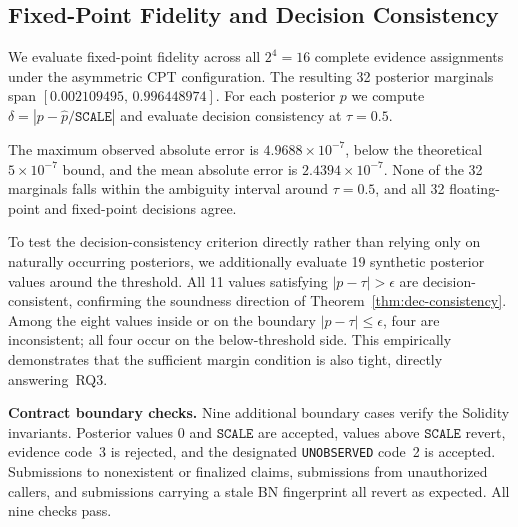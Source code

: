 \documentclass[journal]{IEEEtran}
\theoremstyle{definition}
\theoremstyle{remark}
\begin{document}
\subsection{Fixed-Point Fidelity and Decision Consistency}
\label{sec:exp-fidelity}

We evaluate fixed-point fidelity across all $2^4=16$
complete evidence assignments under the asymmetric CPT
configuration. The resulting 32 posterior marginals span
$[0.002109495,\,0.996448974]$. For each posterior $p$
we compute
$\delta=|p-\widehat{p}/\texttt{SCALE}|$
and evaluate decision consistency at $\tau=0.5$.

\begin{table}[t]
\centering
\caption{Fixed-point encoding fidelity under
$\texttt{SCALE}=10^6$ for all $2^4=16$ complete
evidence assignments (32 posterior marginals).
Near-boundary counts marginals satisfying
$|p-\tau|\leq5{\times}10^{-7}$ at $\tau=0.5$.}
\label{tab:fidelity}
\end{table}

The maximum observed absolute error is
$4.9688\times10^{-7}$, below the theoretical
$5\times10^{-7}$ bound, and the mean absolute error is
$2.4394\times10^{-7}$. None of the 32 marginals falls
within the ambiguity interval around $\tau=0.5$, and all
32 floating-point and fixed-point decisions agree.

To test the decision-consistency criterion directly rather
than relying only on naturally occurring posteriors, we
additionally evaluate 19 synthetic posterior values around
the threshold. All 11 values satisfying
$|p-\tau|>\epsilon$ are decision-consistent, confirming
the soundness direction of
Theorem~\ref{thm:dec-consistency}. Among the eight values
inside or on the boundary
$|p-\tau|\leq\epsilon$, four are inconsistent; all four
occur on the below-threshold side. This empirically
demonstrates that the sufficient margin condition is also
tight, directly answering~RQ3.

\noindent\textbf{Contract boundary checks.}
Nine additional boundary cases verify the Solidity
invariants. Posterior values $0$ and
$\texttt{SCALE}$ are accepted, values above
$\texttt{SCALE}$ revert, evidence code~3 is rejected,
and the designated \texttt{UNOBSERVED} code~2 is
accepted. Submissions to nonexistent or finalized claims,
submissions from unauthorized callers, and submissions
carrying a stale BN fingerprint all revert as expected.
All nine checks pass.
\end{document}
